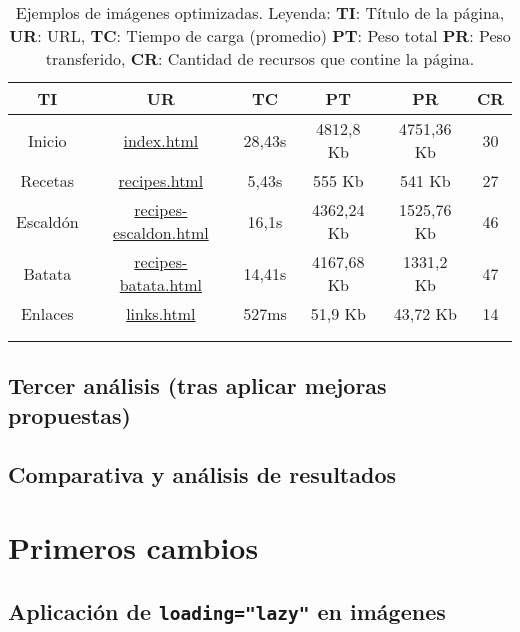 \documentclass{article}
\begin{document}
\begin{longtable}{c|c|c|c|c|c}
    \hline
    \textbf{TI} & \textbf{UR} & \textbf{TC} & \textbf{PT} & \textbf{PR} & \textbf{CR} \\
    \endhead
    \hline
    Inicio & \href{https://www.danielramos.me/hhyc-dramosac/index.html}{index.html} & 28,43s & 4812,8 Kb & 4751,36 Kb & 30 \\
    Recetas & \href{https://www.danielramos.me/hhyc-dramosac/recipes.html}{recipes.html} & 5,43s & 555 Kb & 541 Kb & 27 \\
    Escaldón & \href{https://www.danielramos.me/hhyc-dramosac/recipes-escaldon.html}{recipes-escaldon.html} & 16,1s & 4362,24 Kb & 1525,76 Kb & 46 \\
    Batata & \href{https://www.danielramos.me/hhyc-dramosac/recipes-batata.html}{recipes-batata.html} & 14,41s & 4167,68 Kb & 1331,2 Kb & 47 \\
    Enlaces & \href{https://www.danielramos.me/hhyc-dramosac/links.html}{links.html} & 527ms & 51,9 Kb & 43,72 Kb & 14 \\
    \hline
     \\[1.5ex]
     \caption{
          Ejemplos de imágenes optimizadas.
          Leyenda: 
          \textbf{TI}: Título de la página, 
          \textbf{UR}: URL, 
          \textbf{TC}: Tiempo de carga (promedio) 
          \textbf{PT}: Peso total 
          \textbf{PR}: Peso transferido, 
          \textbf{CR}: Cantidad de recursos que contine la página.
     }
    \label{tab:imagenes-optimizadas}
\end{longtable}

\subsection{Tercer análisis (tras aplicar mejoras propuestas)}\label{sec:tercer-analisis}

\subsection{Comparativa y análisis de resultados}\label{sec:comparativa-y-analisis-de-resultados}

\section{Primeros cambios}\label{sec:primeros-cambios}

\subsection{Aplicación de \texttt{loading="lazy"} en imágenes}\label{subsec:loading-lazy}
\end{document}
